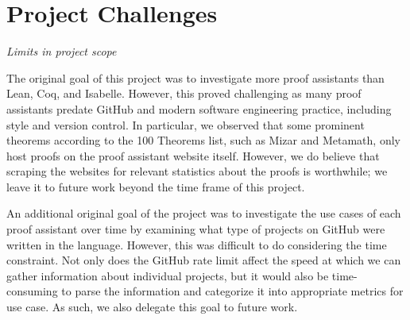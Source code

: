 \documentclass[sigconf,nonacm]{acmart}
\begin{document}
\section{Project Challenges}

\textit{Limits in project scope}

The original goal of this project was to investigate more proof assistants than Lean, Coq, and Isabelle. However, this proved challenging as many proof assistants predate GitHub and modern software engineering practice, including style and version control. In particular, we observed that some prominent theorems according to the 100 Theorems list, such as Mizar and Metamath, only host proofs on the proof assistant website itself. However, we do believe that scraping the websites for relevant statistics about the proofs is worthwhile; we leave it to future work beyond the time frame of this project.

An additional original goal of the project was to investigate the use cases of each proof assistant over time by examining what type of projects on GitHub were written in the language. However, this was difficult to do considering the time constraint. Not only does the GitHub rate limit affect the speed at which we can gather information about individual projects, but it would also be time-consuming to parse the information and categorize it into appropriate metrics for use case. As such, we also delegate this goal to future work. 
\end{document}
